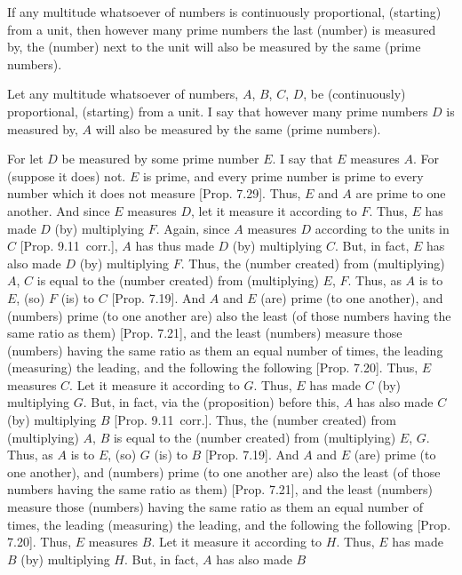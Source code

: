 \begin{Parallel}{}{}
{If  any multitude whatsoever of numbers is continuously proportional, (starting) from a unit, then  however  many prime numbers  the
last (number) is measured by, the (number) next to the unit will also be measured by the same (prime numbers).

\epsfysize=1.1in
\centerline{}

Let any multitude whatsoever of numbers,  $A$, $B$, $C$, $D$, be (continuously) proportional, (starting) from a unit. I say that however many prime
numbers $D$ is measured by, $A$ will also be measured by the same
(prime numbers).

For let $D$ be measured by some prime number $E$. I say that $E$ measures $A$. For (suppose it does) not. $E$ is prime, and every prime number is prime to
every number which it does not measure [Prop. 7.29]. Thus, $E$ and $A$ are prime to one another. And since $E$ measures $D$, let it measure it according to $F$. 
Thus, $E$ has made $D$ (by) multiplying $F$.  Again, since $A$ measures $D$ according to the units in $C$ [Prop. 9.11~corr.],
$A$ has thus made $D$ (by) multiplying $C$. But, in fact, $E$ has also
made $D$ (by) multiplying $F$. Thus, the (number created) from (multiplying)
$A$, $C$ is equal to  the (number created) from (multiplying) $E$, $F$.
Thus, as $A$ is to $E$, (so) $F$ (is) to $C$ [Prop. 7.19]. And $A$ and $E$ (are)  prime (to one another), and (numbers) prime (to one another are) also the least (of those
numbers having the same ratio as them) [Prop. 7.21],
and the least (numbers) measure those (numbers) having the same ratio as them an equal number of times, the leading (measuring) the leading, and the
following the following [Prop. 7.20]. Thus, $E$
measures $C$. Let it measure it according to $G$. Thus, $E$ has made $C$
(by) multiplying $G$. But, in fact, via the (proposition) before this, $A$
has also made $C$ (by) multiplying $B$ [Prop. 9.11~corr.].
 Thus, the (number created) from (multiplying) $A$, $B$ is equal to the
 (number created) from (multiplying) $E$, $G$. Thus, as $A$ is to $E$, (so) $G$ (is) to $B$ [Prop. 7.19]. And $A$ and $E$
 (are) prime (to one another), and (numbers) prime (to one another are) also the least (of those
numbers having the same ratio as them) [Prop. 7.21],
and the least (numbers) measure those (numbers) having the same ratio as them an equal number of times, the leading (measuring) the leading, and the
following the following [Prop. 7.20]. Thus, $E$
measures $B$. Let it measure it according to $H$. Thus, $E$ has made $B$ (by) multiplying $H$. But, in fact, $A$ has also made $B$
}
\end{Parallel}
